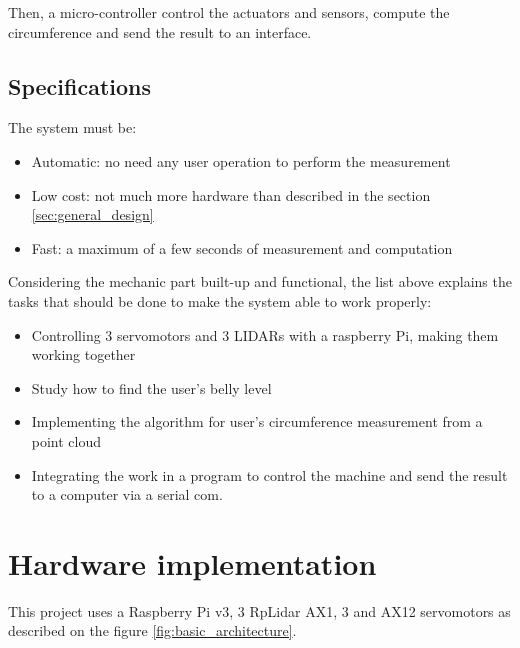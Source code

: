 \documentclass{article}
\newcommand{\vsp}{\vspace{\baselineskip}}
\begin{document}
\vsp

Then, a micro-controller control the actuators and sensors, compute the circumference and send the result to an interface. 

\subsection{Specifications}

The system must be:
\begin{itemize}
    \item Automatic: no need any user operation to perform the measurement
    \item Low cost: not much more hardware than described in the section \ref{sec:general_design}
    \item Fast: a maximum of a few seconds of measurement and computation
\end{itemize}

\vsp

Considering the mechanic part built-up and functional, the list above explains the tasks that should be done to make the system able to work properly: 
\begin{itemize}
    \item Controlling 3 servomotors and 3 LIDARs with a raspberry Pi, making them working together
    \item Study how to find the user's belly level
    \item Implementing the algorithm for user's circumference measurement from a point cloud
    \item Integrating the work in a program to control the machine and send the result to a computer via a serial com.
\end{itemize}

\section{Hardware implementation}

This project uses a Raspberry Pi v3, 3 RpLidar AX1, 3 and AX12 servomotors as described on the figure \ref{fig:basic_architecture}.
\end{document}
